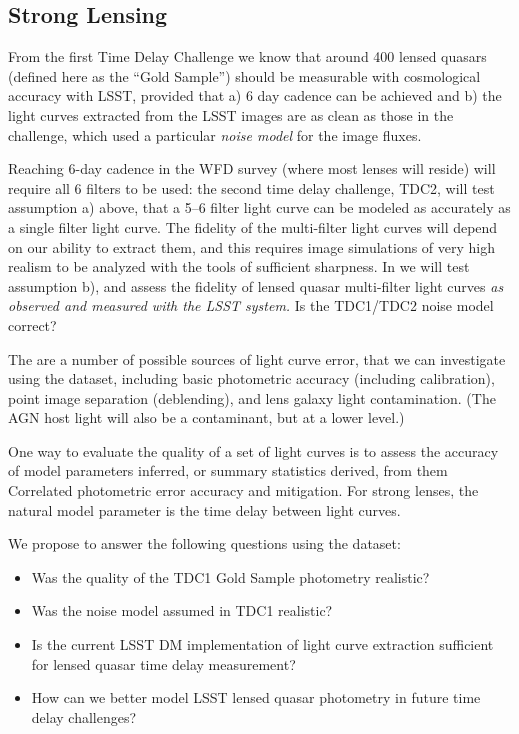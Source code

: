 


\subsection{Strong Lensing}
\label{sec:twinkles1:science:stronglensing}

From the first Time Delay Challenge we know that around 400 lensed
quasars (defined here as the ``Gold Sample'') should be measurable
with cosmological accuracy with LSST, provided that a) 6 day cadence
can be achieved and b) the light curves extracted from the LSST images
are as clean as those in the challenge, which used a particular {\it noise
model} for the image fluxes.

Reaching 6-day cadence  in the WFD survey (where most lenses will
reside) will require all 6 filters to be used: the second time delay
challenge, TDC2, will test assumption a) above, that  a 5--6 filter
light curve can be modeled as accurately as a single filter light
curve. The fidelity of the multi-filter light curves will depend on
our ability to extract them, and this requires image simulations of
very high realism to be analyzed with the tools of sufficient
sharpness. In \TwinklesOne we will test assumption b), and assess the
fidelity of lensed quasar multi-filter light curves {\it as observed and
measured with the LSST system.} Is the TDC1/TDC2 noise model correct?

The are a number of possible sources of light curve error, that we can
investigate using the \TwinklesOne dataset, including basic photometric
accuracy (including calibration), point image separation (deblending), and
lens galaxy light contamination. (The AGN host light will also be a contaminant,
but at a lower level.)

One way to evaluate the quality of a set of light curves is to assess the accuracy of
model parameters inferred, or summary statistics derived, from them
Correlated photometric error accuracy and mitigation. For strong lenses,
the natural model parameter is the time delay between light curves.

We propose to answer the following questions using the \TwinklesOne dataset:
\begin{itemize}
\item Was the quality of the TDC1 Gold Sample photometry realistic?
\item Was the noise model assumed in TDC1 realistic?
\item Is the current LSST DM implementation of light curve extraction
      sufficient for lensed quasar time delay measurement?
\item How can we better model LSST lensed quasar photometry in
      future time delay challenges?
\end{itemize}

